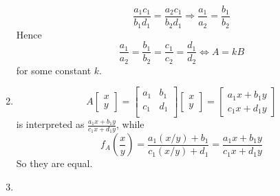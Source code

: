 \documentclass{article}
\begin{document}
\begin{enumerate}
\[     \frac{a_1c_1}{b_1d_1}=\frac{a_2c_1}{b_2d_1}\Rightarrow \frac{a_1}{a_2}=\frac{b_1}{b_2}
     \]
     Hence
     \[\frac{a_1}{a_2}=\frac{b_1}{b_2}=\frac{c_1}{c_2}=\frac{d_1}{d_2}\Leftrightarrow A = k B\]
     for some constant $k$.
     \item 
     \[A\left[\begin{array}{r}x\\y\end{array}\right]=\left[\begin{array}{cc} a_1 & b_1 \\ c_1 &  d_1 \\ \end{array}\right]\left[\begin{array}{r}x\\y\end{array}\right] = \left[\begin{array}{r}a_1x+b_1y\\c_1x+d_1y\end{array}\right]\]
     is interpreted as $\frac{a_1x+b_1y}{c_1x+d_1y}$, while
     \[f_A\left(\frac{x}{y}\right) = \frac{a_1(x/y)+b_1}{c_1(x/y)+d_1}=\frac{a_1x+b_1y}{c_1x+d_1y}\]
     So they are equal.
     \item
\end{enumerate}
\end{document}
